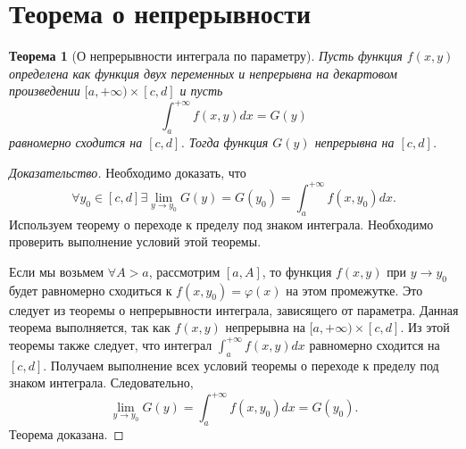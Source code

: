 \documentclass{article}
\theoremstyle{plain}
\newtheorem{theorem}{Теорема}
\theoremstyle{definition}
\theoremstyle{remark}
\begin{document}
\section*{Теорема о непрерывности}
\begin{theorem}[О непрерывности интеграла по параметру]
Пусть функция $f(x, y)$ определена как функция двух переменных
и непрерывна на декартовом произведении $[a, +\infty) \times [c, d]$ и пусть
\[
\int_{a}^{+\infty} f(x, y)dx = G(y)
\]
равномерно сходится на $[c, d]$. Тогда функция $G(y)$ непрерывна на $[c, d]$.
\end{theorem}
\begin{proof}[Доказательство]
Необходимо доказать, что
\[
\forall y_0 \in [c, d] \exists 
\lim_{y \to y_0} G(y) = G(y_0) = \int_{a}^{+\infty} f(x, y_0)dx.
\]
Используем теорему о переходе к пределу под знаком интеграла. Необходимо проверить выполнение условий этой теоремы.

Если мы возьмем $\forall A > a$, рассмотрим $[a, A]$, то функция $f(x, y)$ при $y \to y_0$ будет равномерно сходиться к $f(x, y_0) = \varphi(x)$ на этом промежутке. Это следует из теоремы о непрерывности интеграла, зависящего от параметра. Данная теорема выполняется, так как $f(x, y)$ непрерывна на $[a, +\infty) \times [c, d]$. Из этой теоремы также следует, что интеграл $\int_{a}^{+\infty} f(x, y)dx$ равномерно сходится на $[c, d]$. Получаем выполнение всех условий теоремы о переходе к пределу под знаком интеграла. Следовательно,
\[\lim_{y \to y_0} G(y) = \int_{a}^{+\infty} f(x, y_0)dx = G(y_0).\]
Теорема доказана.
\end{proof}
\end{document}
